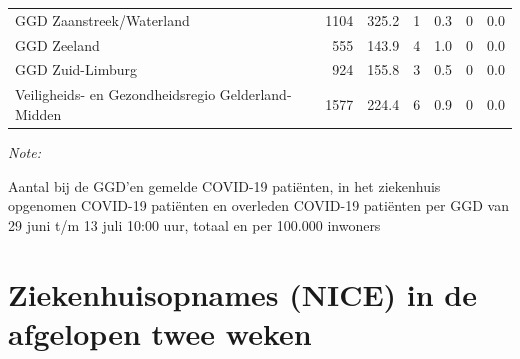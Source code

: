 \documentclass[
  english,
  man,floatsintext]{apa6}
\begin{document}
\begin{table}
\begin{threeparttable}
\begin{tabular}{lrrrrrr}
GGD Zaanstreek/Waterland & 1104 & 325.2 & 1 & 0.3 & 0 & 0.0\\
GGD Zeeland & 555 & 143.9 & 4 & 1.0 & 0 & 0.0\\
GGD Zuid-Limburg & 924 & 155.8 & 3 & 0.5 & 0 & 0.0\\
Veiligheids- en Gezondheidsregio Gelderland-Midden & 1577 & 224.4 & 6 & 0.9 & 0 & 0.0\\
\bottomrule
\end{tabular}
\begin{tablenotes}
\item \textit{Note: } 
\item Aantal bij de GGD’en gemelde COVID-19 patiënten, in het ziekenhuis opgenomen COVID-19 patiënten en overleden COVID-19 patiënten per GGD van 29 juni t/m 13 juli 10:00 uur, totaal en per 100.000 inwoners
\end{tablenotes}
\end{threeparttable}
\endgroup{}
\end{table}

\newpage

\hypertarget{ziekenhuisopnames-nice-in-de-afgelopen-twee-weken}{%
\section{Ziekenhuisopnames (NICE) in de afgelopen twee weken}\label{ziekenhuisopnames-nice-in-de-afgelopen-twee-weken}}
\end{document}
